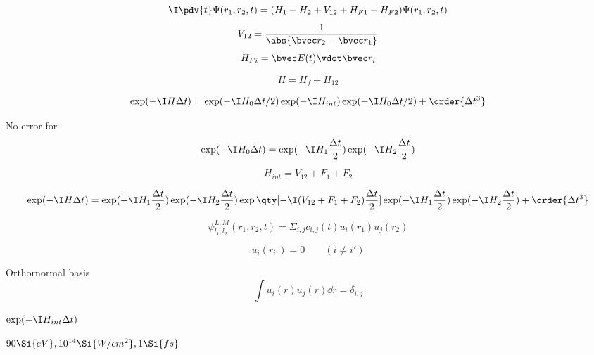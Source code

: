 
\begin{equation}
\I \pdv{t}\Psi(r_1, r_2, t) = (H_1 + H_2 + V_{12} + H_{F1} + H_{F2})\Psi(r_1, r_2, t)
\end{equation}
\begin{equation}
V_{12} = \frac{1}{\abs{\bvec r_2 - \bvec r_1}}
\end{equation}
\begin{equation}
H_{Fi} = \bvec E(t) \vdot \bvec r_i
\end{equation}

\begin{equation}
H = H_f + H_{12}
\end{equation}

\begin{equation}
\exp(-\I H \Delta t) = \exp(-\I H_0 \Delta t/2) \exp(-\I H_{int}) \exp(-\I H_0 \Delta t/2) + \order{\Delta t^3}
\end{equation}

No error for
\begin{equation}
\exp(-\I H_0 \Delta t) = \exp(-\I H_{1} \frac{\Delta t}{2}) \exp(-\I H_2 \frac{\Delta t}{2})
\end{equation}

\begin{equation}
H_{int} = V_{12} + F_1 + F_2
\end{equation}

\begin{equation}
\exp(-\I H\Delta t) = \exp(-\I H_{1} \frac{\Delta t}{2}) \exp(-\I H_2 \frac{\Delta t}{2}) \exp\qty[-\I (V_{12} + F_1 + F_2) \frac{\Delta t}{2}] \exp(-\I H_{1} \frac{\Delta t}{2}) \exp(-\I H_{2} \frac{\Delta t}{2}) + \order{\Delta t^3}
\end{equation}

\begin{equation}
\psi_{l_1,l_2}^{L,M}(r_1, r_2, t) = \Sigma_{i,j} c_{i,j}(t) u_i(r_1) u_j(r_2)
\end{equation}

\begin{equation}
u_i(r_{i'}) = 0 \qquad (i \ne i')
\end{equation}

Orthornormal basis
\begin{equation}
\int u_i(r)u_j(r) \dd{r} = \delta_{i,j}
\end{equation}

$\exp(-\I H_{int}\Delta t)$

$90\Si{eV}, 10^{14} \Si{W/cm^2}, 1\Si{fs}$


